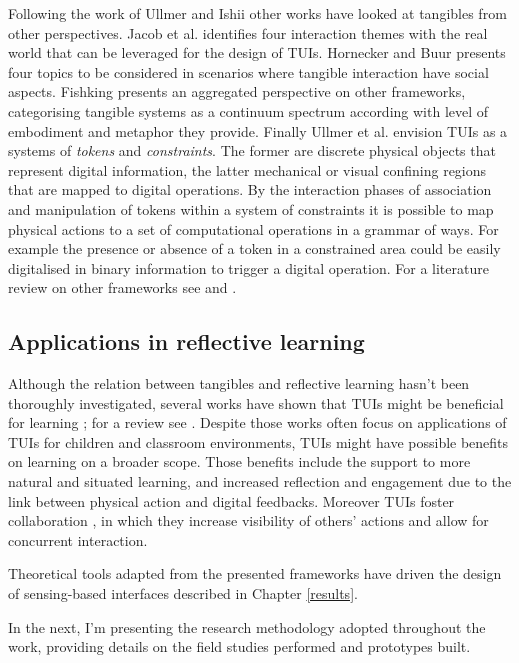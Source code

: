 Following the work of Ullmer and Ishii other works have looked at tangibles from other perspectives. Jacob et al. \autocite*{Jacob:2008vm} identifies four interaction themes with the real world that can be leveraged for the design of TUIs. Hornecker and Buur \autocite*{Hornecker:2006uq} presents four topics to be considered in scenarios where tangible interaction have social aspects. Fishking \autocite{Fishkin:2004uv} presents an aggregated perspective on other frameworks, categorising tangible systems as a continuum spectrum according with level of embodiment and metaphor they provide. Finally Ullmer et al. \autocite{Ullmer:2005jz} envision TUIs as a systems of \emph{tokens} and \emph{constraints}. The former are discrete physical objects that represent digital information, the latter mechanical or visual confining regions that are mapped to digital operations. By the interaction phases of association and manipulation of tokens within a system of constraints it is possible to map physical actions to a set of computational operations in a grammar of ways. For example the presence or absence of a token in a constrained area could be easily digitalised in binary information to trigger a digital operation. For a literature review on other frameworks see \autocite{Mazalek:2009uy} and \autocite{Shaer:2009fx}.

\subsection{Applications in reflective learning}\label{applications-of-tangibles-in-reflective-learning}

Although the relation between tangibles and reflective learning hasn't been thoroughly investigated, several works have shown that TUIs might be beneficial for learning \autocite{Marshall:2007dr}; for a review see \autocite{omalley:hal-00190328}. Despite those works often focus on applications of TUIs for children and classroom environments, TUIs might have possible benefits on learning on a broader scope. Those benefits include the support to more natural \autocite{Terrenghi:2005gq} and situated \autocite{Klemmer:2006ez} learning, and increased reflection and engagement \autocite{Rogers:2006te} due to the link between physical action and digital feedbacks. Moreover TUIs foster collaboration \autocite{Rogers:2003tt}, in which they increase visibility of others' actions and allow for concurrent interaction.

Theoretical tools adapted from the presented frameworks have driven the design of sensing-based interfaces described in Chapter \ref{results}.

In the next, I'm presenting the research methodology adopted throughout the work, providing details on the field studies performed and prototypes built. 

